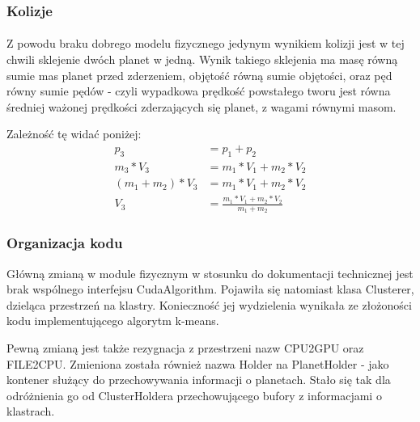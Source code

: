 \subsubsection{Kolizje}
\paragraph{}

Z powodu braku dobrego modelu fizycznego jedynym wynikiem kolizji jest w tej chwili sklejenie dwóch planet w jedną. Wynik takiego sklejenia ma masę równą sumie mas planet przed zderzeniem, objętość równą sumie objętości, oraz pęd równy sumie pędów - czyli wypadkowa prędkość powstałego tworu jest równa średniej ważonej prędkości zderzających się planet, z wagami równymi masom.

Zależność tę widać poniżej:
\begin{align}
p_3 & = p_1 + p_2 \\
m_3 * V_3 & = m_1 * V_1 + m_2 * V_2 \\
( m_1 + m_2 ) * V_3 & = m_1 * V_1 + m_2 * V_2 \\
V_3 & = \frac{ m_1 * V_1 + m_2 * V_2 }{ m_1 + m_2 }
\end{align}

\paragraph{}

\subsubsection{Organizacja kodu}
Główną zmianą w module fizycznym w stosunku do dokumentacji technicznej jest brak wspólnego interfejsu CudaAlgorithm. Pojawiła się natomiast klasa Clusterer, dzieląca przestrzeń na klastry. Konieczność jej wydzielenia wynikała ze złożoności kodu implementującego algorytm k-means.

Pewną zmianą jest także rezygnacja z przestrzeni nazw CPU2GPU oraz FILE2CPU. Zmieniona została również nazwa Holder na PlanetHolder - jako kontener służący do przechowywania informacji o planetach. Stało się tak dla odróżnienia go od ClusterHoldera przechowującego bufory z informacjami o klastrach.



